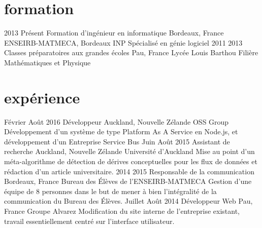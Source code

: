\section{formation}
\begin{experiencelist}
\entry
    {2013}
    {Présent}
    {Formation d'ingénieur en informatique}
    {Bordeaux, France}
    {ENSEIRB-MATMECA, Bordeaux INP}
    {
        Spécialisé en génie logiciel 
    }
\entry
    {2011}
    {2013}
    {Classes préparatoires aux grandes écoles}
    {Pau, France}
    {Lycée Louis Barthou}
    {
        Filière Mathématiques et Physique
    }
\end{experiencelist}



\section{expérience}
\begin{experiencelist}
\entry
    {Février}
    {Août 2016}
    {Développeur}
    {Auckland, Nouvelle Zélande}
    {OSS Group}
    {
        Développement d'un système de type Platform As A Service en Node.js, et développement d'un Entreprise Service Bus
     }
\entry
    {Juin}
    {Août 2015}
    {Assistant de recherche}
    {Auckland, Nouvelle Zélande}
    {Université d'Auckland}
    {
        Mise au point d'un méta-algorithme de détection de dérives conceptuelles pour les flux de données et rédaction d'un article universitaire.
    }
\entry
    {2014}
    {2015}
    {Responsable de la communication}
    {Bordeaux, France}
    {Bureau des Élèves de l'ENSEIRB-MATMECA}
    {
        Gestion d'une équipe de 8 personnes dans le but de mener à bien l'intégralité de la communication du Bureau des Élèves.
    }
\entry
    {Juillet}
    {Août 2014}
    {Développeur Web}
    {Pau, France}
    {Groupe Alvarez}
    {
        Modification du site interne de l'entreprise existant, travail essentiellement centré sur l'interface utilisateur.
    }
\end{experiencelist}



